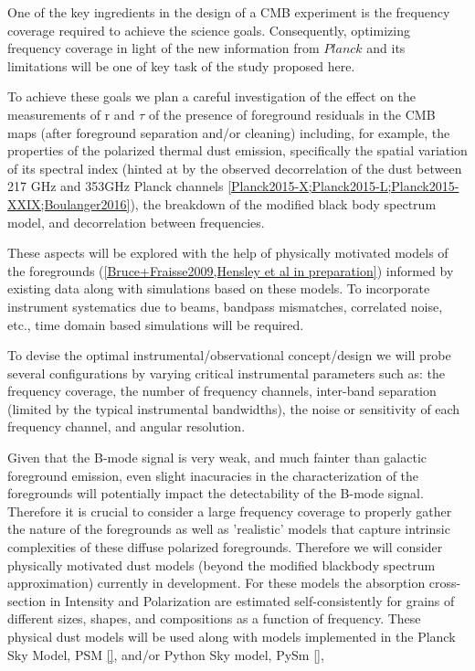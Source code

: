 One of the key ingredients in the design of a CMB experiment is the frequency coverage required to achieve the science goals. Consequently, optimizing frequency coverage in light of the new information from $Planck$ and its limitations will be one of key task of the study proposed here. 

To achieve these goals we plan a careful investigation of the effect on the measurements of r and $\tau$ of the presence of foreground residuals in the CMB maps (after foreground separation and/or cleaning) including, for example, the properties of the polarized thermal dust emission, specifically the spatial variation of its spectral index (hinted at by the observed decorrelation of the dust between 217 GHz and 353GHz Planck channels \ref{Planck2015-X;Planck2015-L;Planck2015-XXIX;Boulanger2016}), the breakdown of the modified black body spectrum model, and decorrelation between frequencies. 

These aspects will be explored with the help of physically motivated models of the foregrounds (\ref{Bruce+Fraisse2009,Hensley et al in preparation}) informed by existing data along with simulations based on these models. To incorporate instrument systematics due to beams, bandpass mismatches, correlated noise, etc., time domain based simulations will be required.

To devise the optimal instrumental/observational concept/design we will probe several configurations by varying critical instrumental parameters such as: the frequency coverage, the number of frequency channels, inter-band separation (limited by the typical instrumental bandwidths), the noise or sensitivity of each frequency channel, and angular resolution. 

Given that the B-mode signal is very weak, and much fainter than galactic foreground emission, even slight inacuracies in the characterization of the foregrounds will potentially impact the detectability of the B-mode signal. Therefore it is crucial to consider a large frequency coverage to properly gather the nature of the foregrounds as well as 'realistic' models that capture intrinsic complexities of these diffuse polarized foregrounds.
Therefore we will consider physically motivated dust models (beyond the modified blackbody spectrum approximation) currently in development. 
For these models the absorption cross-section in Intensity and Polarization are estimated self-consistently for grains of different sizes, shapes, and compositions as a function of frequency. These physical dust models will be used along with models implemented in the Planck Sky Model, PSM \ref{}, and/or  Python Sky model, PySm \ref{}, 


